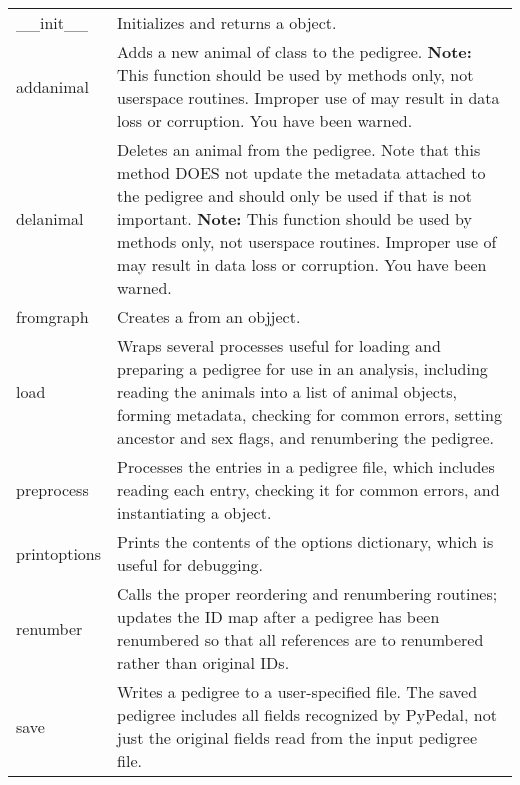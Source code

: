 \begin{center}
    \tablelasttail{\hline}
    \label{tbl:objects-newpedigree-methods}
    \begin{xtabular}{l|p{4in}}
        \_\_init\_\_ & Initializes and returns a  object. \\
        addanimal & Adds a new animal of class  to the pedigree. \textbf{Note:} This function should be used by  methods only, not userspace routines. Improper use of  may result in data loss or corruption. You have been warned. \\
        delanimal & Deletes an animal from the pedigree. Note that this method DOES not update the metadata attached to the pedigree and should only be used if that is not important. \textbf{Note:} This function should be used by  methods only, not userspace routines. Improper use of  may result in data loss or corruption. You have been warned. \\
        fromgraph & Creates a  from an  objject. \\
	load & Wraps several processes useful for loading and preparing a pedigree for use in an analysis, including reading the animals into a list of animal objects, forming metadata, checking for common errors, setting ancestor and sex flags, and renumbering the pedigree. \\
	preprocess & Processes the entries in a pedigree file, which includes reading each entry, checking it for common errors, and instantiating a  object. \\
	printoptions & Prints the contents of the options dictionary, which is useful for debugging. \\
	renumber & Calls the proper reordering and renumbering routines; updates the ID map after a pedigree has been renumbered so that all references are to renumbered rather than original IDs. \\
	save & Writes a \PyPedal{} pedigree to a user-specified file.  The saved pedigree includes all fields recognized by PyPedal, not just the original fields read from the input pedigree file. \\

\end{xtabular}
\end{center}
